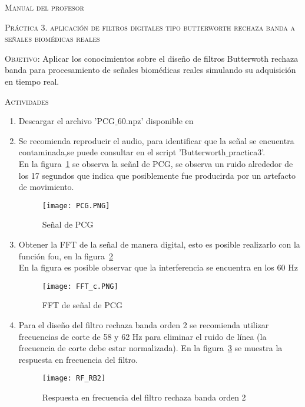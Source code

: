 \documentclass[10pt,letterpaper,spanish,twoside]{report}
\begin{document}
\docdate

\begin{center}
 \textsc{\asignatura}\vspace{.2em}
\end{center}

\textsc{Manual del profesor}

\textsc{Práctica 3. aplicación de filtros digitales tipo butterworth rechaza banda a señales biomédicas reales}

\textsc{Objetivo:} Aplicar los conocimientos sobre el diseño de filtros Butterwoth rechaza banda para procesamiento de señales biomédicas reales simulando su adquisición en tiempo real.

\textsc{Actividades}
\begin{enumerate}
 \item Descargar el archivo 'PCG$\_$60.npz' disponible en 
 \item Se recomienda reproducir el audio, para identificar que la señal se encuentra contaminada,se puede consultar en el script 'Butterworth$\_$practica3'. 
 \\En la figura~\ref{contexto:PCG} se observa la señal de PCG, se observa un ruido alrededor de los 17 segundos que indica que posiblemente fue producirda por un artefacto de movimiento.
 \begin{figure}[H]
 	\centering
 	\texttt{[image: PCG.PNG]}
 	\caption{Señal de PCG}
	\label{contexto:PCG}
 \end{figure}
 \item Obtener la FFT de la señal de manera digital, esto es posible realizarlo con la función fou, en la figura~\ref{contexto:FFT_c}
 \\En la figura es posible observar que la interferencia se encuentra en los 60 Hz 
 \begin{figure}[H]
 	\centering
 	\texttt{[image: FFT\_c.PNG]}
 	\caption{FFT de señal de PCG}
 	\label{contexto:FFT_c}
 \end{figure}
 \item Para el diseño del filtro rechaza banda orden 2 se recomienda utilizar frecuencias de corte de 58 y 62 Hz para eliminar el ruido de línea (la frecuencia de corte debe estar normalizada). En la figura~\ref{contexto:RF_RB2} se muestra la respuesta en frecuencia del filtro.
 \begin{figure}[H]
 	\centering
 	\texttt{[image: RF\_RB2]}
 	\caption{Respuesta en frecuencia del filtro rechaza banda orden 2}
 	\label{contexto:RF_RB2}
 \end{figure}

\end{enumerate}
\end{document}
